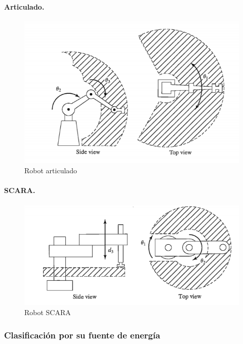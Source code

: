 \paragraph{Articulado.}

\begin{figure}
    \centering
    \includegraphics[scale=0.8]{./img/chapter2/articulado.png}
    \caption{Robot articulado}
    \label{fig:robotarticulado}
\end{figure}

\paragraph{SCARA.}

\begin{figure}
    \centering
    \includegraphics[scale=0.8]{./img/chapter2/scara.png}
    \caption{Robot SCARA}
    \label{fig:robotscara}
\end{figure}

\subsubsection{Clasificación por su fuente de energía}


